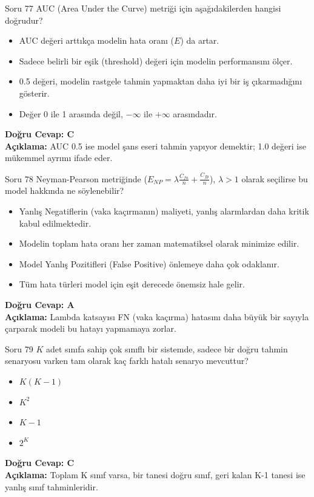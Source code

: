\documentclass[12pt,a4paper]{article}
\begin{document}
\begin{testcard}{Soru 77}
    AUC (Area Under the Curve) metriği için aşağıdakilerden hangisi doğrudur?
    \begin{itemize}
        \item[A)] AUC değeri arttıkça modelin hata oranı ($E$) da artar.
        \item[B)] Sadece belirli bir eşik (threshold) değeri için modelin performansını ölçer.
        \item[C)] 0.5 değeri, modelin rastgele tahmin yapmaktan daha iyi bir iş çıkarmadığını gösterir.
        \item[D)] Değer 0 ile 1 arasında değil, $-\infty$ ile $+\infty$ arasındadır.
    \end{itemize}
    \tcblower
    \textbf{Doğru Cevap: C} \\
    \textbf{Açıklama:} AUC 0.5 ise model şans eseri tahmin yapıyor demektir; 1.0 değeri ise mükemmel ayrımı ifade eder.
\end{testcard}

\begin{testcard}{Soru 78}
    Neyman-Pearson metriğinde ($E_{NP} = \lambda \frac{C_{fn}}{n} + \frac{C_{fp}}{n}$), $\lambda > 1$ olarak seçilirse bu model hakkında ne söylenebilir?
    \begin{itemize}
        \item[A)] Yanlış Negatiflerin (vaka kaçırmanın) maliyeti, yanlış alarmlardan daha kritik kabul edilmektedir.
        \item[B)] Modelin toplam hata oranı her zaman matematiksel olarak minimize edilir.
        \item[C)] Model Yanlış Pozitifleri (False Positive) önlemeye daha çok odaklanır.
        \item[D)] Tüm hata türleri model için eşit derecede önemsiz hale gelir.
    \end{itemize}
    \tcblower
    \textbf{Doğru Cevap: A} \\
    \textbf{Açıklama:} Lambda katsayısı FN (vaka kaçırma) hatasını daha büyük bir sayıyla çarparak modeli bu hatayı yapmamaya zorlar.
\end{testcard}

\begin{testcard}{Soru 79}
    $K$ adet sınıfa sahip çok sınıflı bir sistemde, sadece bir doğru tahmin senaryosu varken tam olarak kaç farklı hatalı senaryo mevcuttur?
    \begin{itemize}
        \item[A)] $K(K-1)$
        \item[B)] $K^2$
        \item[C)] $K-1$
        \item[D)] $2^K$
    \end{itemize}
    \tcblower
    \textbf{Doğru Cevap: C} \\
    \textbf{Açıklama:} Toplam K sınıf varsa, bir tanesi doğru sınıf, geri kalan K-1 tanesi ise yanlış sınıf tahminleridir.
\end{testcard}
\end{document}
